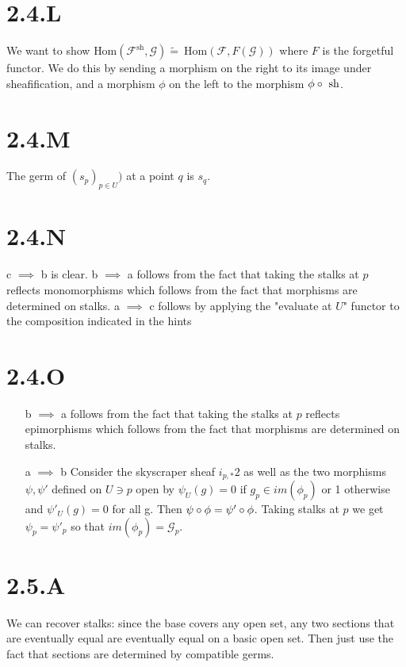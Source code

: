 \documentclass{article}
\begin{document}
\section*{2.4.L}
We want to show $\text{Hom}(\mathscr{F}^\text{sh}, \mathscr{G}) \widetilde{=}\
    \text{Hom}(\mathscr{F}, F(\mathscr{G}))$ where $F$ is the
forgetful functor. We do this by sending a morphism on the right to its image
under sheafification, and a morphism $\phi$ on the left to the
morphism $\phi \circ \
    \text{sh}$.

\section*{2.4.M}
The germ of $(s_p)_{p \in U})$ at a point $q$ is
$s_q$.

\section*{2.4.N}
c $\implies$ b is clear. b $\implies$ a follows from
the fact that taking the stalks at $p$ reflects
monomorphisms which follows from the fact that morphisms are determined on
stalks. a $\implies$ c follows by applying the "evaluate at
$U$" functor to the composition indicated in the hints

\section*{2.4.O}
\begin{itemize}
    \item[b $\implies$ a] follows from the fact that taking the stalks at $p$ reflects
        epimorphisms which follows from the fact that morphisms are determined on
        stalks.
    \item[a $\implies$ b] Consider the skyscraper sheaf $i_{p,*}2$ as well as the two
        morphisms $\psi, \psi'$ defined on $U \ni p$ open by
        $\psi_U(g)=0$ if $g_p \in im(\phi_p)$ or 1 otherwise and
        $\psi'_U(g)=0$ for all g. Then $\psi \circ \phi = \psi' \circ \phi$. Taking stalks at
        $p$ we get $\psi_p=\psi'_p$ so that
        $im(\phi_p)=\mathscr{G}_p$.
\end{itemize}

\section*{2.5.A}
We can recover stalks: since the base covers any open set, any two sections
that are eventually equal are eventually equal on a basic open set. Then just
use the fact that sections are determined by compatible germs.
\end{document}
